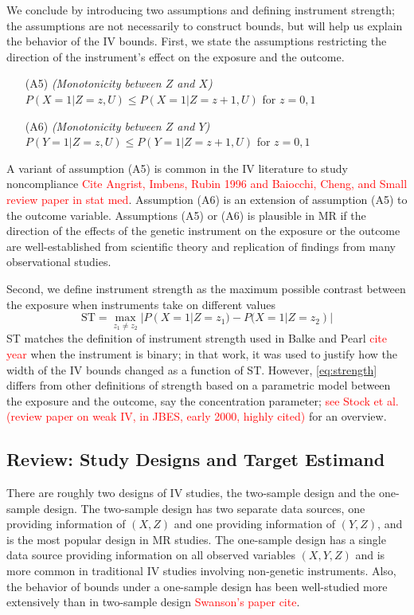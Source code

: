 \documentclass[
]{article}
\theoremstyle{plain}
\begin{document}
We conclude by introducing two assumptions and defining instrument strength; the assumptions are not necessarily to construct bounds, but will help us explain the behavior of the IV bounds. First, we state the assumptions restricting the direction of the instrument's effect on the exposure and the outcome.
\begin{itemize}
\item[(A5)] \emph{(Monotonicity between $Z$ and $X$)} $P(X = 1 | Z = z, U) \le P(X = 1 | Z = z+1, U)$ for $z=0,1$
\item[(A6)] \emph{(Monotonicity between $Z$ and $Y$)} $P(Y = 1 | Z = z, U) \le P(Y = 1 | Z = z+1, U)$ for $z=0,1$
\end{itemize}
A variant of assumption (A5) is common in the IV literature to study noncompliance \textcolor{red}{Cite Angrist, Imbens, Rubin 1996 and Baiocchi, Cheng, and Small review paper in stat med}. Assumption (A6) is an extension of assumption (A5) to the outcome variable. Assumptions (A5) or (A6) is plausible in MR if the direction of the effects of the genetic instrument on the exposure or the outcome are well-established from scientific theory and replication of findings from many observational studies. 

Second, we define instrument strength as the maximum possible contrast between the exposure when instruments take on different values 
\begin{equation}
\text{ST} = \max_{z_1 \neq z_2} | P(X = 1 | Z = z_1) - P(X = 1 | Z = z_2) | \label{eq:strength}
\end{equation}
ST matches the definition of instrument strength used in Balke and Pearl \textcolor{red}{cite year} when the instrument is binary; in that work, it was used to justify how the width of the IV bounds changed as a function of $\text{ST}$. However, \eqref{eq:strength} differs from other definitions of strength based on a parametric model between the exposure and the outcome, say the concentration parameter; \textcolor{red}{see Stock et al. (review paper on weak IV, in JBES, early 2000, highly cited)} for an overview.


\subsection{Review: Study Designs and Target Estimand}
There are roughly two designs of IV studies, the two-sample design and the one-sample design. The two-sample design has two separate data sources, one providing information of \((X,Z)\) and one providing information of \((Y,Z)\), and is the most popular design in MR studies. The one-sample design has a single data source providing information on all observed variables \((X,Y,Z)\) and is more common in traditional IV studies involving non-genetic instruments. Also, the behavior of bounds under a one-sample design has been well-studied more extensively than in two-sample design \textcolor{red}{Swanson's paper cite}. 
\end{document}
